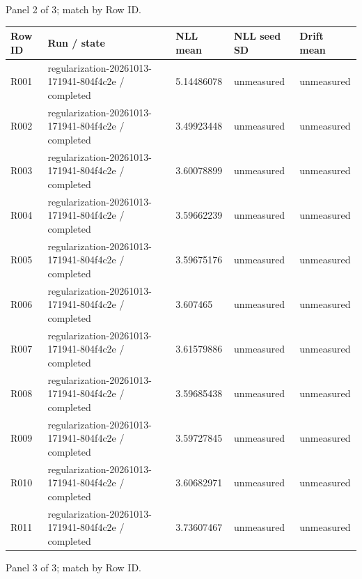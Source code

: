 \documentclass[10pt]{article}
\begin{document}
\par\noindent Panel 2 of 3; match by Row ID.
{\scriptsize\setlength{\tabcolsep}{2pt}
\begin{longtable}{p{}p{}p{}p{}p{}}
Row ID & Run / state & NLL mean & NLL seed SD & Drift mean \\
\hline\endhead
R001 & regularization-20261013-171941-804f4c2e / completed & 5.14486078 & unmeasured & unmeasured \\
R002 & regularization-20261013-171941-804f4c2e / completed & 3.49923448 & unmeasured & unmeasured \\
R003 & regularization-20261013-171941-804f4c2e / completed & 3.60078899 & unmeasured & unmeasured \\
R004 & regularization-20261013-171941-804f4c2e / completed & 3.59662239 & unmeasured & unmeasured \\
R005 & regularization-20261013-171941-804f4c2e / completed & 3.59675176 & unmeasured & unmeasured \\
R006 & regularization-20261013-171941-804f4c2e / completed & 3.607465 & unmeasured & unmeasured \\
R007 & regularization-20261013-171941-804f4c2e / completed & 3.61579886 & unmeasured & unmeasured \\
R008 & regularization-20261013-171941-804f4c2e / completed & 3.59685438 & unmeasured & unmeasured \\
R009 & regularization-20261013-171941-804f4c2e / completed & 3.59727845 & unmeasured & unmeasured \\
R010 & regularization-20261013-171941-804f4c2e / completed & 3.60682971 & unmeasured & unmeasured \\
R011 & regularization-20261013-171941-804f4c2e / completed & 3.73607467 & unmeasured & unmeasured \\
\end{longtable}}
\par\noindent Panel 3 of 3; match by Row ID.
\end{document}
